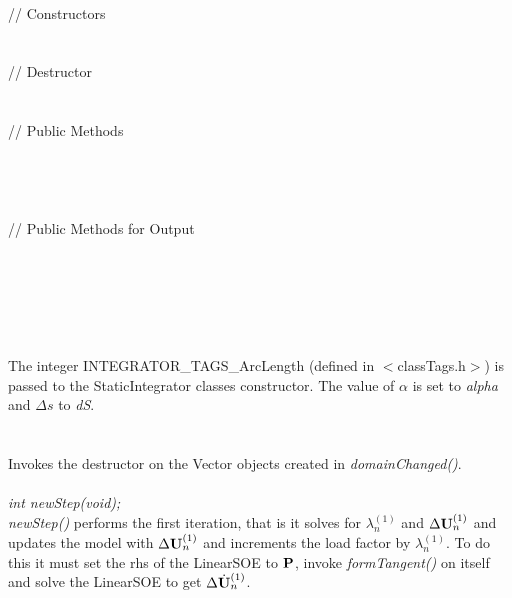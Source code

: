  \\
\indent // Constructors \\
\\ \\
\indent // Destructor \\
\\  \\
\indent // Public Methods \\
 \\
 \\
\\ \\
\indent // Public Methods for Output\\
\\ 
\\ 
\\

 \\
\\ \\
The integer INTEGRATOR\_TAGS\_ArcLength (defined in
$<$classTags.h$>$) is passed to the StaticIntegrator classes
constructor. The value of $\alpha$ is set to {\em alpha} and 
$\Delta s$ to {\em dS}. \\

 \\
\\ 
Invokes the destructor on the Vector objects created in {\em
domainChanged()}. \\

\\

{\em int newStep(void);} \\
{\em newStep()} performs the first iteration, that is it solves for 
$\lambda_n^{(1)}$ and $\Delta \U_n^{(1)}$ and updates the model with
$\Delta \U_n^{(1)}$ and increments the load factor by
$\lambda_n^{(1)}$. To do this it must set the rhs of the LinearSOE to
$\P$, invoke {\em formTangent()} on itself and solve the LinearSOE to
get $\Delta \Uh_n^{(1)}$. \\

